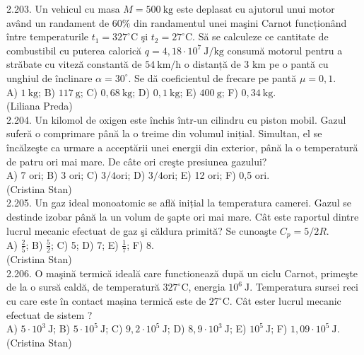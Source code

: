 \documentclass[10pt]{article}
\begin{document}
2.203. Un vehicul cu masa $M=500 \mathrm{~kg}$ este deplasat cu ajutorul unui motor având un randament de $60 \%$ din randamentul unei maşini Carnot funcționând între temperaturile $t_{1}=327^{\circ} \mathrm{C}$ şi $t_{2}=27^{\circ} \mathrm{C}$. Să se calculeze ce cantitate de combustibil cu puterea calorică $q=4,18 \cdot 10^{7} \mathrm{~J} / \mathrm{kg}$ consumă motorul pentru a străbate cu viteză constantă de $54 \mathrm{~km} / \mathrm{h}$ o distanță de 3 km pe o pantă cu unghiul de înclinare $\alpha=30^{\circ}$. Se dă coeficientul de frecare pe pantă $\mu=0,1$.\\ A) $1 \mathrm{~kg}$; B) $117 \mathrm{~g}$; C) $0,68 \mathrm{~kg}$; D) $0,1 \mathrm{~kg}$; E) $400 \mathrm{~g}$; F) $0,34 \mathrm{~kg}$.\\ (Liliana Preda)\\

2.204. Un kilomol de oxigen este închis într-un cilindru cu piston mobil. Gazul suferă o comprimare până la o treime din volumul inițial. Simultan, el se încălzeşte ca urmare a acceptării unei energii din exterior, până la o temperatură de patru ori mai mare. De câte ori creşte presiunea gazului?\\ A) 7 ori; B) 3 ori; C) $3 / 4 \mathrm{ori}$; D) $3 / 4 \mathrm{ori}$; E) 12 ori; F) 0,5 ori.\\ (Cristina Stan)\\

2.205. Un gaz ideal monoatomic se află inițial la temperatura camerei. Gazul se destinde izobar până la un volum de şapte ori mai mare. Cât este raportul dintre lucrul mecanic efectuat de gaz şi căldura primită? Se cunoaşte $C_{p}=5 / 2 R$.\\ A) $\frac{2}{5}$; B) $\frac{5}{2}$; C) 5; D) 7; E) $\frac{1}{7}$; F) 8.\\ (Cristina Stan)\\

2.206. O maşină termică ideală care functionează după un ciclu Carnot, primeşte de la o sursă caldă, de temperatură $327^{\circ} \mathrm{C}$, energia $10^{6} \mathrm{~J}$. Temperatura sursei reci cu care este în contact mașina termică este de $27^{\circ} \mathrm{C}$. Cât ester lucrul mecanic efectuat de sistem ?\\ A) $5 \cdot 10^{3} \mathrm{~J}$; B) $5 \cdot 10^{5} \mathrm{~J}$; C) $9,2 \cdot 10^{5} \mathrm{~J}$; D) $8,9 \cdot 10^{3} \mathrm{~J}$; E) $10^{5} \mathrm{~J}$; F) $1,09 \cdot 10^{5} \mathrm{~J}$.\\ (Cristina Stan)\\
\end{document}
